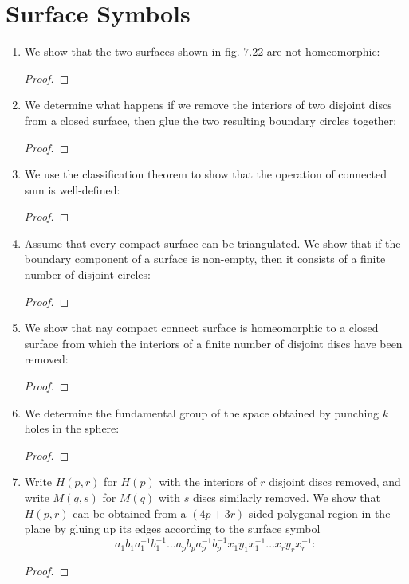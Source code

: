 \documentclass{book}
\begin{document}
\section{Surface Symbols}
\begin{enumerate}[(1)]
    \item We show that the two surfaces shown in fig. $7.22$ are not homeomorphic: 
        \begin{proof}
        \end{proof}

    \item We determine what happens if we remove the interiors of two disjoint discs from a closed surface, then glue the two resulting boundary circles together: 
        \begin{proof}
        \end{proof}

    \item We use the classification theorem to show that the operation of connected sum is well-defined: 
        \begin{proof}
        \end{proof}

    \item Assume that every compact surface can be triangulated. We show that if the boundary component of a surface is non-empty, then it consists of a finite number of disjoint circles: 
        \begin{proof}
        \end{proof}

    \item We show that nay compact connect surface is homeomorphic to a closed surface from which the interiors of a finite number of disjoint discs have been removed: 
        \begin{proof}
        \end{proof}

    \item We determine the fundamental group of the space obtained by punching $k$ holes in the sphere: 
        \begin{proof}
        \end{proof}

    \item Write $H(p,r)$ for $H(p)$ with the interiors of $r$ disjoint discs removed, and write $M(q,s)$ for $M(q)$ with $s$ discs similarly removed. We show that $H(p,r)$ can be obtained from a $(4p + 3r)$-sided polygonal region in the plane by gluing up its edges according to the surface symbol 
        \[a_1 b_1 a^{-1}_1 b^{-1}_1 \dots a_p b_p a^{-1}_p b^{-1}_p x_1 y_1 x_1^{-1} \dots x_r y_r x^{-1}_r:\]
        \begin{proof}
        \end{proof}


\end{enumerate}
\end{document}
